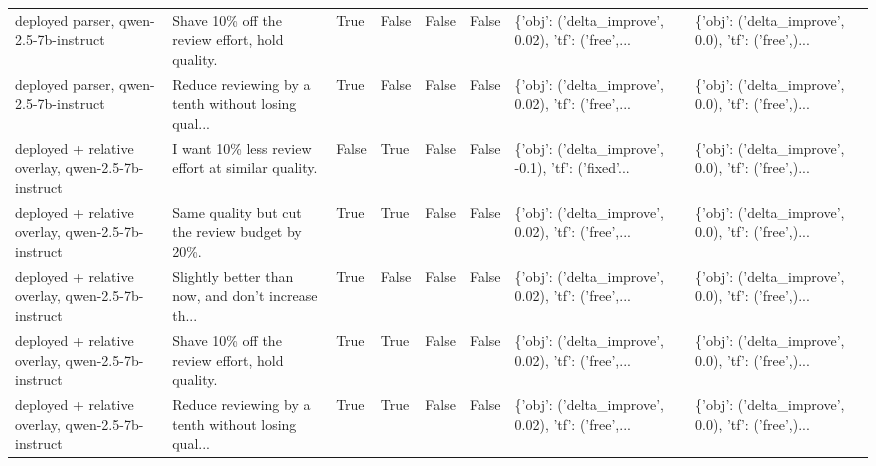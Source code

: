 \begin{tabular}{llllllll}
            deployed parser, qwen-2.5-7b-instruct &     Shave 10\% off the review effort, hold quality. &           True &   False &    False &    False & \{'obj': ('delta\_improve', 0.02), 'tf': ('free',... & \{'obj': ('delta\_improve', 0.0), 'tf': ('free',)... \\
            deployed parser, qwen-2.5-7b-instruct & Reduce reviewing by a tenth without losing qual... &           True &   False &    False &    False & \{'obj': ('delta\_improve', 0.02), 'tf': ('free',... & \{'obj': ('delta\_improve', 0.0), 'tf': ('free',)... \\
deployed + relative overlay, qwen-2.5-7b-instruct &  I want 10\% less review effort at similar quality. &          False &    True &    False &    False & \{'obj': ('delta\_improve', -0.1), 'tf': ('fixed'... & \{'obj': ('delta\_improve', 0.0), 'tf': ('free',)... \\
deployed + relative overlay, qwen-2.5-7b-instruct &     Same quality but cut the review budget by 20\%. &           True &    True &    False &    False & \{'obj': ('delta\_improve', 0.02), 'tf': ('free',... & \{'obj': ('delta\_improve', 0.0), 'tf': ('free',)... \\
deployed + relative overlay, qwen-2.5-7b-instruct & Slightly better than now, and don't increase th... &           True &   False &    False &    False & \{'obj': ('delta\_improve', 0.02), 'tf': ('free',... & \{'obj': ('delta\_improve', 0.0), 'tf': ('free',)... \\
deployed + relative overlay, qwen-2.5-7b-instruct &     Shave 10\% off the review effort, hold quality. &           True &    True &    False &    False & \{'obj': ('delta\_improve', 0.02), 'tf': ('free',... & \{'obj': ('delta\_improve', 0.0), 'tf': ('free',)... \\
deployed + relative overlay, qwen-2.5-7b-instruct & Reduce reviewing by a tenth without losing qual... &           True &    True &    False &    False & \{'obj': ('delta\_improve', 0.02), 'tf': ('free',... & \{'obj': ('delta\_improve', 0.0), 'tf': ('free',)... \\
\bottomrule
\end{tabular}
